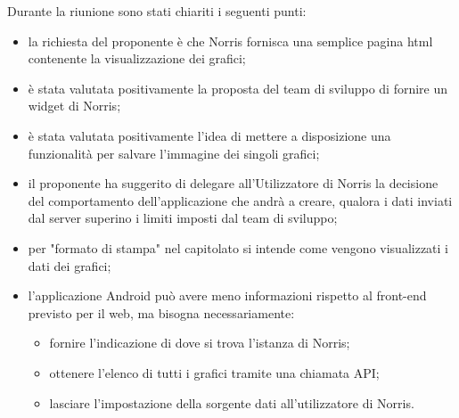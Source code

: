 Durante la riunione sono stati chiariti i seguenti punti:
\begin{itemize}
\item la richiesta del proponente è che Norris fornisca una semplice pagina html contenente la visualizzazione dei grafici;
\item è stata valutata positivamente la proposta del team di sviluppo di fornire un widget di Norris;
\item è stata valutata positivamente l'idea di mettere a disposizione una funzionalità per salvare l'immagine dei singoli grafici;
\item il proponente ha suggerito di delegare all'Utilizzatore di Norris la decisione del comportamento dell'applicazione che andrà a creare, qualora i dati inviati dal server superino i limiti imposti dal team di sviluppo;
\item per "formato di stampa" nel capitolato si intende come vengono visualizzati i dati dei grafici;
\item l'applicazione Android può avere meno informazioni rispetto al front-end previsto per il web, ma bisogna necessariamente:
\begin{itemize}
\item fornire l'indicazione di dove si trova l'istanza di Norris;
\item ottenere l'elenco di tutti i grafici tramite una chiamata API;
\item lasciare l'impostazione della sorgente dati all'utilizzatore di Norris.
\end{itemize}
\end{itemize}